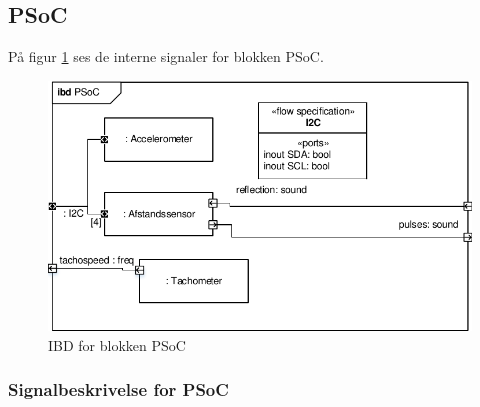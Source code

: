 \subsection{PSoC}

På figur \ref{fig:ibd_psoc} ses de interne signaler for blokken PSoC.

\begin{figure}[h]
\centering
\includegraphics[scale=1]{../fig/diagrammer/bil/ibd_PSoC.pdf}
\caption{IBD for blokken PSoC}
\label{fig:ibd_psoc}
\end{figure}

\subsubsection{Signalbeskrivelse for PSoC}

